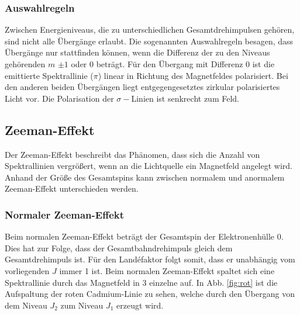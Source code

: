             \subsubsection{Auswahlregeln}

                Zwischen Energieniveaus, die zu unterschiedlichen Gesamtdrehimpulsen 
                gehören, sind nicht alle Übergänge erlaubt. Die sogenannten Auswahlregeln
                besagen, dass Übergänge nur stattfinden können, wenn die Differenz 
                der zu den Niveaus gehörenden $m$ $\pm1$ oder 0 beträgt.
                Für den Übergang mit Differenz 0 ist die emittierte Spektrallinie ($\pi$)
                linear in Richtung des Magnetfeldes polarisiert. Bei den anderen beiden 
                Übergängen liegt entgegengesetztes zirkular polarisiertes Licht vor. 
                Die Polarisation der $\sigma-$Linien ist senkrecht zum Feld.


        \subsection{Zeeman-Effekt}

            Der Zeeman-Effekt beschreibt das Phänomen, dass sich die Anzahl von 
            Spektrallinien vergrößert, wenn an die Lichtquelle ein Magnetfeld angelegt wird.
            Anhand der Größe des Gesamtspins kann zwischen normalem und anormalem Zeeman-Effekt 
            unterschieden werden.

            \subsubsection{Normaler Zeeman-Effekt}

                Beim normalen Zeeman-Effekt beträgt der Gesamtspin der Elektronenhülle 0. 
                Dies hat zur Folge, dass der Gesamtbahndrehimpuls gleich dem Gesamtdrehimpuls ist.
                Für den Land\'{e}faktor folgt somit, dass er unabhängig vom 
                vorliegenden $J$ immer 1 ist. Beim normalen Zeeman-Effekt spaltet sich eine 
                Spektrallinie durch das Magnetfeld in 3 einzelne auf. 
                In Abb. \ref{fig:rot} ist die Aufspaltung der roten Cadmium-Linie zu sehen, 
                welche durch den Übergang von dem Niveau $J_2$ zum Niveau $J_1$ erzeugt wird.

